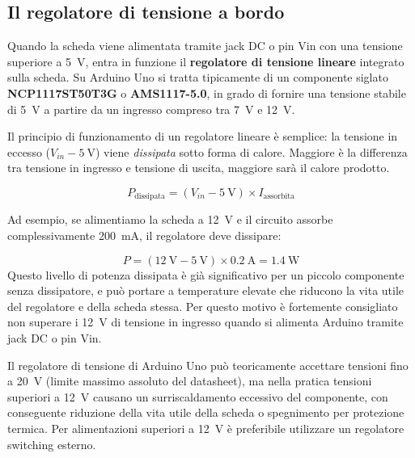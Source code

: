 \subsection*{Il regolatore di tensione a bordo}

Quando la scheda viene alimentata tramite jack DC o pin Vin con una tensione superiore a \SI{5}{\volt}, entra in funzione il \textbf{regolatore di tensione lineare} integrato sulla scheda. Su Arduino Uno si tratta tipicamente di un componente siglato \textbf{NCP1117ST50T3G} o \textbf{AMS1117-5.0}, in grado di fornire una tensione stabile di \SI{5}{\volt} a partire da un ingresso compreso tra \SI{7}{\volt} e \SI{12}{\volt}.

Il principio di funzionamento di un regolatore lineare è semplice: la tensione in eccesso ($V_{in} - \SI{5}{\volt}$) viene \textit{dissipata} sotto forma di calore. Maggiore è la differenza tra tensione in ingresso e tensione di uscita, maggiore sarà il calore prodotto.

\begin{equation}
    P_{\text{dissipata}} = (V_{in} - \SI{5}{\volt}) \times I_{\text{assorbita}}
\end{equation}

Ad esempio, se alimentiamo la scheda a \SI{12}{\volt} e il circuito assorbe complessivamente \SI{200}{\milli\ampere}, il regolatore deve dissipare:

\[
    P = (\SI{12}{\volt} - \SI{5}{\volt}) \times \SI{0.2}{\ampere} = \SI{1.4}{\watt}
\]
Questo livello di potenza dissipata è già significativo per un piccolo componente senza dissipatore, e può portare a temperature elevate che riducono la vita utile del regolatore e della scheda stessa. Per questo motivo è fortemente consigliato non superare i \SI{12}{\volt} di tensione in ingresso quando si alimenta Arduino tramite jack DC o pin Vin.

\begin{tcolorbox}[colback=orange!4, colframe=orange!70, title=\textbf{Perché non superare i \SI{12}{\volt}?}]
    Il regolatore di tensione di Arduino Uno può teoricamente accettare tensioni fino a \SI{20}{\volt} (limite massimo assoluto del datasheet), ma nella pratica tensioni superiori a \SI{12}{\volt} causano un surriscaldamento eccessivo del componente, con conseguente riduzione della vita utile della scheda o spegnimento per protezione termica. Per alimentazioni superiori a \SI{12}{\volt} è preferibile utilizzare un regolatore switching esterno.
\end{tcolorbox}

